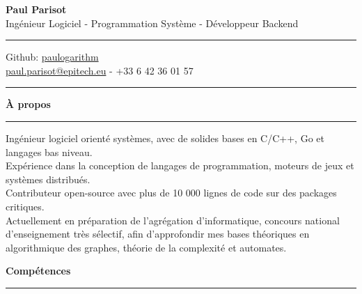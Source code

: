 \documentclass[9pt]{extarticle}
\begin{document}
\begin{center}
	{\huge\bfseries Paul Parisot}
	\\[9pt]
	{\Large Ingénieur Logiciel - Programmation Système - Développeur Backend}
	\\
\end{center}


\par\vspace{-5pt}
\rule{\linewidth}{0.4pt}
\par\vspace{-5pt}

\begin{center}
	Github: \href{https://github.com/paulogarithm}{paulogarithm}
	\\
	\href{mailto:paul.parisot@epitech.eu}{paul.parisot@epitech.eu} - +33 6 42 36 01 57
	\\
\end{center}

\par\vspace{-10pt}
\rule{\linewidth}{0.4pt}
\par\vspace{7pt}


{\large\bfseries À propos}
\par\vspace{-8pt}
\rule{\linewidth}{0.4pt}
\par\vspace{5pt}

Ingénieur logiciel orienté systèmes, avec de solides bases en C/C++, Go et langages bas niveau.
\\
Expérience dans la conception de langages de programmation, moteurs de jeux et systèmes distribués.
\\
Contributeur open-source avec plus de 10 000 lignes de code sur des packages critiques.
\\
Actuellement en préparation de l'agrégation d'informatique, concours national d'enseignement très sélectif, afin d'approfondir mes bases théoriques en algorithmique des graphes, théorie de la complexité et automates.
\par\vspace{5pt}


{\large\bfseries Compétences}
\par\vspace{-8pt}
\rule{\linewidth}{0.4pt}
\par\vspace{5pt}
\end{document}
